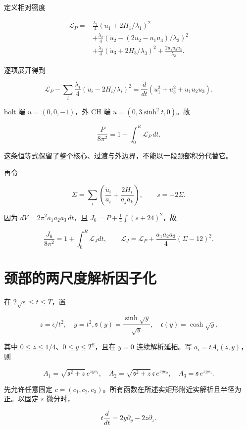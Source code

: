 \documentclass[UTF8,11pt,openany,oneside,fontset=none]{ctexbook}
\begin{document}
定义相对密度

\[
\begin{aligned}
\mathscr L_P={}&\frac{\lambda_1}{4}
(\dot u_1+2H_1/\lambda_1)^2\\
&+\frac{\lambda_2}{4}
(\dot u_2-(2u_2-u_1u_3)/\lambda_2)^2\\
&+\frac{\lambda_3}{4}
(\dot u_3+2H_3/\lambda_3)^2
+\frac{2u_1u_2u_3}{\lambda_2}.
\end{aligned}
\]

逐项展开得到

\[
 \mathscr L_P-\sum_i\frac{\lambda_i}{4}
 (\dot u_i-2H_i/\lambda_i)^2
 =\frac d{dt}(u_1^2+u_3^2+u_1u_2u_3).
\]

bolt 端 \(u=(0,0,-1)\)，外 CH 端 \(u=(0,3\sinh^2t,0)\)。故

\[
\boxed{\frac{P}{8\pi^2}=1+\int_0^R\mathscr L_P\,dt.}
\tag{9.4}\label{eq:r9:4}
\]

这条恒等式保留了整个核心、过渡与外边界，不能以一段颈部积分代替它。

再令

\[
 \Sigma=\sum_i\left(\frac{\dot u_i}{a_i}
 +\frac{2H_i}{a_ja_k}\right),\qquad s=-2\Sigma.
\]

因为 \(dV=2\pi^2a_1a_2a_3\,dt\)，且 \(J_6=P+\frac14\int(s+24)^2\)，故

\[
 \frac{J_6}{8\pi^2}
 =1+\int_0^R\mathscr L_Jdt,\qquad
 \mathscr L_J=\mathscr L_P+
 \frac{a_1a_2a_3}{4}(\Sigma-12)^2.
\tag{9.5}\label{eq:r9:5}
\]

\section{颈部的两尺度解析因子化}\label{ch9:ux9888ux90e8ux7684ux4e24ux5c3aux5ea6ux89e3ux6790ux56e0ux5b50ux5316}

在 \(2\sqrt\epsilon\le t\le T\)，置

\[
 z=\epsilon/t^2,\quad y=t^2,
 \mathfrak s(y)=\frac{\sinh\sqrt y}{\sqrt y},\quad
 \mathfrak c(y)=\cosh\sqrt y.
\]

其中 \(0\le z\le1/4\)、\(0\le y\le T^2\)，且在 \(y=0\) 连续解析延拓。写 \(a_i=tA_i(z,y)\)，则

\[
 A_1=\sqrt{\mathfrak s^2+z}\,e^{zyc_1},\quad
 A_2=\sqrt{\mathfrak s^2+z}\,\mathfrak c\,e^{zyc_2},\quad
 A_3=\mathfrak s\,e^{zyc_3}.
\]

先允许任意固定 \(c=(c_1,c_2,c_3)\)。所有函数在所述实矩形附近实解析且半径为正。以固定 \(\varepsilon\) 微分时，

\[
 t\frac d{dt}=2y\partial_y-2z\partial_z.
\]
\end{document}

